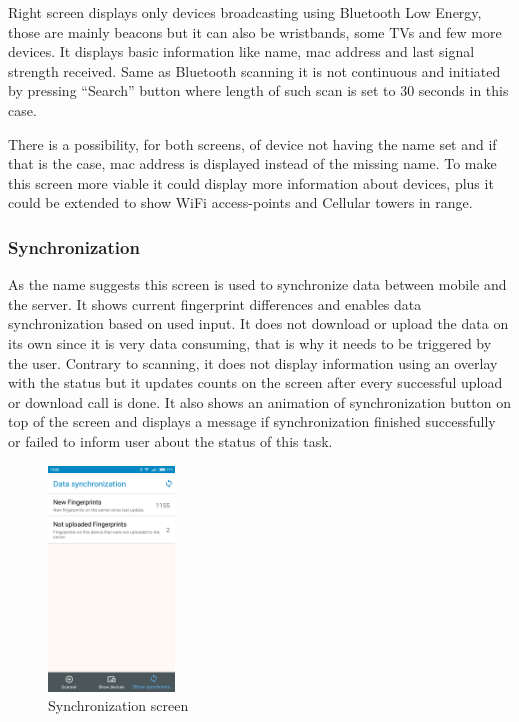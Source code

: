 Right screen displays only devices broadcasting using Bluetooth Low Energy, those are mainly beacons but it can also be wristbands, some TVs and few more devices. It displays basic information like name, mac address and last signal strength received. Same as Bluetooth scanning it is not continuous and initiated by pressing \enquote{Search} button where length of such scan is set to 30 seconds in this case.

There is a possibility, for both screens, of device not having the name set and if that is the case, mac address is displayed instead of the missing name. To make this screen more viable it could display more information about devices, plus it could be extended to show WiFi access-points and Cellular towers in range.

\subsubsection{Synchronization}\label{subsec:Synchronization}
As the name suggests this screen is used to synchronize data between mobile and the server. It shows current fingerprint differences and enables data synchronization based on used input. It does not download or upload the data on its own since it is very data consuming, that is why it needs to be triggered by the user. Contrary to scanning, it does not display information using an overlay with the status but it updates counts on the screen after every successful upload or download call is done. It also shows an animation of synchronization button on top of the screen and displays a message if synchronization finished successfully or failed to inform user about the status of this task.

\begin{figure}[H]
	\begin{centering}
		\includegraphics[width=0.3\textwidth]{img/synchronization}
		\par\end{centering}
	\caption{Synchronization screen}
	\label{fig08c05}
\end{figure}


